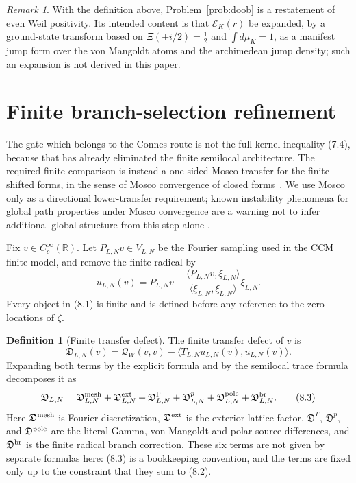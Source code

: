 \documentclass[11pt]{amsart}
\theoremstyle{definition}
\newtheorem{definition}[theorem]{Definition}
\theoremstyle{remark}
\newtheorem{remark}[theorem]{Remark}
\newcommand{\R}{\mathbb R}
\newcommand{\QW}{\mathcal Q_W}
\newcommand{\XiR}{\Xi}
\begin{document}
\begin{remark}
With the definition above, Problem~\ref{prob:doob} is a restatement of
even Weil positivity.  Its intended content is that \(\mathscr E_K(r)\)
be expanded, by a ground-state transform based on
\(\XiR(\pm i/2)=\tfrac12\) and \(\int d\mu_K=1\), as a manifest jump form over
the von Mangoldt atoms and the archimedean jump density; such an
expansion is not derived in this paper.
\end{remark}

\section{Finite branch-selection refinement}

The gate which belongs to the Connes route is not the full-kernel
inequality (7.4), because that has already eliminated the finite
semilocal architecture.  The required finite comparison is instead a
one-sided Mosco
transfer for the finite shifted forms, in the sense of Mosco convergence
of closed forms~\cite{Mosco1969,KuwaeShioya2003,Post2012}.  We use Mosco
only as a directional lower-transfer requirement; known instability
phenomena for global path properties under Mosco convergence are a
warning not to infer additional global structure from this step alone
\cite{SuzukiUemura2014}.

Fix \(v\in C_c^\infty(\R)\).  Let \(P_{L,N}v\in V_{L,N}\) be the Fourier
sampling used in the CCM finite model, and remove the finite radical by
\[
 u_{L,N}(v)
 =
 P_{L,N}v-
 \frac{\langle P_{L,N}v,\xi_{L,N}\rangle}
      {\langle \xi_{L,N},\xi_{L,N}\rangle}\xi_{L,N}.
\tag{8.1}
\]
Every object in (8.1) is finite and is defined before any reference to
the zero locations of \(\zeta\).

\begin{definition}[Finite transfer defect]
The finite transfer defect of \(v\) is
\[
 \mathfrak D_{L,N}(v)
 =
 \QW(v,v)-
 \langle T_{L,N}u_{L,N}(v),u_{L,N}(v)\rangle .
\tag{8.2}
\]
Expanding both terms by the explicit formula and by the semilocal trace
formula decomposes it as
\[
 \mathfrak D_{L,N}
 =
 \mathfrak D^{\rm mesh}_{L,N}
 +\mathfrak D^{\rm ext}_{L,N}
 +\mathfrak D^{\Gamma}_{L,N}
 +\mathfrak D^{p}_{L,N}
 +\mathfrak D^{\rm pole}_{L,N}
 +\mathfrak D^{\rm br}_{L,N}.
\tag{8.3}
\]
Here \(\mathfrak D^{\rm mesh}\) is Fourier discretization, 
\(\mathfrak D^{\rm ext}\) is the exterior lattice factor,
\(\mathfrak D^{\Gamma}\), \(\mathfrak D^p\), and
\(\mathfrak D^{\rm pole}\) are the literal Gamma, von Mangoldt and polar
source differences, and \(\mathfrak D^{\rm br}\) is the finite radical
branch correction.  These six terms are not given by separate formulas
here: (8.3) is a bookkeeping convention, and the terms are fixed only up
to the constraint that they sum to (8.2).
\end{definition}
\end{document}
